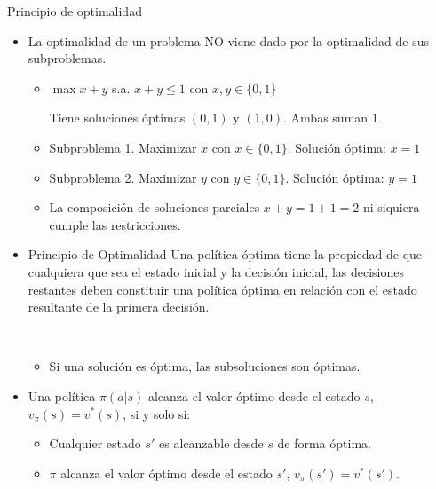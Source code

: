 \documentclass[10pt, envcountsect, handout, aspectratio=1610, hyperref={hypertexnames=true}]{beamer}
\begin{document}
\begin{frame}{Principio de optimalidad}
	
	\begin{itemize}
		\item La optimalidad de un problema NO viene dado por la optimalidad de sus subproblemas.
		
		\begin{itemize}
			\item $\max x + y$ s.a.  $x + y \leq 1$ con $x, y \in \{0, 1\}$
			
			Tiene soluciones óptimas \( (0, 1) \) y \( (1, 0) \). Ambas suman 1.
			
			\item Subproblema 1. Maximizar \( x \) con $x \in \{0, 1\}$. Solución óptima: \( x = 1 \)
			\item Subproblema 2. Maximizar \( y \) con $y \in \{0, 1\}$. Solución óptima: \( y = 1 \)
			\item La composición de soluciones parciales $x+y=1+1=2$ ni siquiera cumple las restricciones.
		\end{itemize}

	
		\item \begin{minipage}{.9\textwidth}
			\begin{block}{Principio de Optimalidad}
				Una política óptima tiene la propiedad de que cualquiera que sea el estado inicial y la decisión inicial, las decisiones restantes deben constituir una política óptima en relación con el estado resultante de la primera decisión. \citep{bellman1957dynamic}
			\end{block}
		\end{minipage}
		
			~
			
			\begin{itemize}
				\item Si una solución es óptima, las subsoluciones son óptimas.
			\end{itemize}
	
		\item \begin{minipage}{.9\textwidth}
			\begin{theorem}
				Una política $\pi(a|s)$ alcanza el valor óptimo desde el estado $s$, $v_\pi(s) = v^*(s)$, si y solo si:  
				\begin{itemize}
					\item Cualquier estado $s'$ es alcanzable desde $s$ de forma óptima.
					\item $\pi$ alcanza el valor óptimo desde el estado $s'$, $v_\pi(s') = v^*(s')$.
				\end{itemize}
			\end{theorem}
\end{minipage}

\end{itemize}	

\end{frame}
\end{document}
